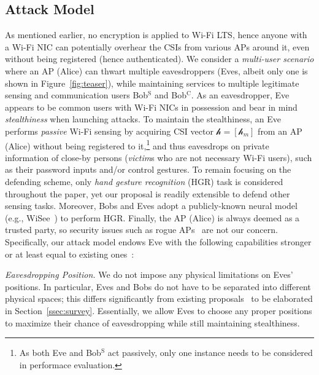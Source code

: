 \documentclass[conference,compsoc]{IEEEtran}
\newcommand{\sname}{\textsc{mimo}Crypt\xspace}
\newcommand{\newrev}[1]{{\color{blue}#1}}    %
\newcommand{\newrev}[1]{#1}
\begin{document}
\subsection{Attack Model} \label{ssec:attackm}
\vspace{-1ex}
%
As mentioned earlier, \newrev{no encryption is applied to Wi-Fi LTS, hence} anyone with a Wi-Fi NIC can potentially overhear the CSIs from various APs around it, even without being registered (hence authenticated). \newrev{We consider a \textit{multi-user scenario} where an AP (Alice) can thwart multiple eavesdroppers (Eves, albeit only one is shown in Figure~\ref{fig:teaser}), while maintaining services to multiple legitimate sensing and communication users Bob$^{\mathrm{S}}$ and Bob$^{\mathrm{C}}$.
%
As an eavesdropper,
Eve appears to be common users with Wi-Fi NICs in possession and bear in mind \textit{stealthiness} when launching attacks.}
To maintain the stealthiness, an Eve performs \textit{passive} Wi-Fi sensing by acquiring \newrev{CSI vector $\bm{\mathcal{h}} = [\mathcal{h}_{m}]$} from an AP (Alice) without being registered to it,\footnote{As both Eve and Bob$^{\mathrm{S}}$ act passively, only one instance needs to be considered in performace evaluation.} 
and thus eavesdrops on private information of close-by persons (\textit{victim}s who are not necessary Wi-Fi users), such as their password inputs and/or control gestures. 
To remain focusing on the defending scheme, only \textit{hand gesture recognition} (HGR) task is considered throughout the paper, yet our proposal is readily extensible to defend other sensing tasks. Moreover, Bobs and Eves adopt a publicly-known neural model (e.g., WiSee~\cite{WiSee-MobiCom13}) to perform HGR.
Finally, the AP (Alice) is always deemed as a trusted party, so security issues such as rogue APs~\cite{RogueAP-TMC,RogueAP-CCS16} are not our concern. Specifically, our attack model endows 
Eve with the following capabilities stronger or at least equal to existing ones~\cite{PhyCloak-NSDI16}:

\emph{Eavesdropping Position.}
%
We do not impose any physical limitations on Eves' positions. In particular, Eves 
and Bobs do not have to be separated into different physical spaces; this differs significantly from existing proposals~\cite{Aegis-INFOCOM18,EtTuAlexa-NDSS20,IRShield-SP22} to be elaborated in Section~\ref{ssec:survey}. %
Essentially, we allow Eves to choose any proper positions to maximize their chance of eavesdropping while still maintaining stealthiness. 
\end{document}
